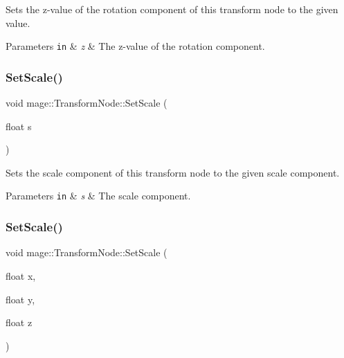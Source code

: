 Sets the z-\/value of the rotation component of this transform node to the given value.


\begin{DoxyParams}[1]{Parameters}
\mbox{\tt in}  & {\em z} & The z-\/value of the rotation component. \\
\hline
\end{DoxyParams}
\hypertarget{classmage_1_1_transform_node_af85bcef02284aab46c597dde0331c7de}{}\label{classmage_1_1_transform_node_af85bcef02284aab46c597dde0331c7de} 
\subsubsection{\texorpdfstring{Set\+Scale()}{SetScale()}\hspace{0.1cm}{\footnotesize\ttfamily [1/4]}}
{\footnotesize\ttfamily void mage\+::\+Transform\+Node\+::\+Set\+Scale (\begin{DoxyParamCaption}\item[{float}]{s }\end{DoxyParamCaption})}

Sets the scale component of this transform node to the given scale component.


\begin{DoxyParams}[1]{Parameters}
\mbox{\tt in}  & {\em s} & The scale component. \\
\hline
\end{DoxyParams}
\hypertarget{classmage_1_1_transform_node_a2921532479b9d41a4df04ef298dc0e20}{}\label{classmage_1_1_transform_node_a2921532479b9d41a4df04ef298dc0e20} 
\subsubsection{\texorpdfstring{Set\+Scale()}{SetScale()}\hspace{0.1cm}{\footnotesize\ttfamily [2/4]}}
{\footnotesize\ttfamily void mage\+::\+Transform\+Node\+::\+Set\+Scale (\begin{DoxyParamCaption}\item[{float}]{x,  }\item[{float}]{y,  }\item[{float}]{z }\end{DoxyParamCaption})}

